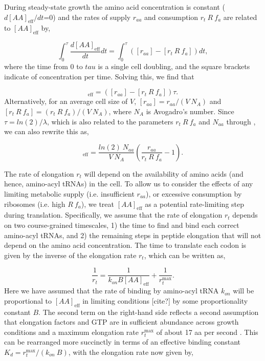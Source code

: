 During steady-state
growth the amino acid concentration is constant ($d[AA]_{\text{eff}}/dt$=0) and the rates of supply
$r_{aa}$ and consumption $r_t \ R \ f_a$ are related to $[AA]_{\text{eff}}$ by,

\begin{equation}
\int_{0}^{\tau} \frac{d[AA]_{\text{eff}}}{dt} dt =  \int_{0}^{\tau} ([r_{aa}] - [r_t \ R \ f_a]) dt,
\end{equation}
where the time from 0 to $tau$ is a single cell doubling, and the square brackets indicate of concentration per time. Solving this, we find that

\begin{equation}
[AA]_{\text{eff}} =  ([r_{aa}] - [r_t \ R \ f_a]) \tau.
\end{equation}
Alternatively, for an average cell size of $V$,  $[r_{aa}] = r_{aa}/(V \ N_A)$
and $[r_t \ R \ f_a] = (r_t \ R \ f_a)/(V \ N_A)$, where $N_A$ is Avogadro's
number. Since $\tau = ln(2)/\lambda$, which is also related to the parameters
$r_t \ R \ f_a$ and $N_{aa}$ through , we
can also rewrite this as,

\begin{equation}
[AA]_{\text{eff}} = \frac{ln(2) \ N_{aa}}{V \ N_A} \left(\frac{r_{aa}}{r_t \ R \ f_a} - 1 \right) .
\label{eq:aa_final}
\end{equation}

The rate of elongation $r_t$ will depend on the availability of amino acids (and
hence, amino-acyl tRNAs) in the cell. To allow us to consider the effects of any
limiting metabolic supply (i.e. insufficient $r_{aa}$), or excessive consumption
by ribosomes (i.e. high $R \ f_a$), we treat $[AA]_{\text{eff}}$ as a potential
rate-limiting step during translation. Specifically, we assume that the rate of
elongation $r_t$ depends on two course-grained timescales, 1) the time to find
and bind each correct amino-acyl tRNAs, and
2) the remaining steps in peptide elongation that will not depend on the amino
acid concentration. The time to translate each codon is given by the inverse of the elongation
rate $r_t$, which can be written as,

\begin{equation}
\frac{1}{r_t} = \frac{1}{k_{on} B [AA]_{\text{eff}}} + \frac{1}{r_{t}^{\text{max}}}.
\end{equation}
Here we have assumed that the rate of binding by amino-acyl tRNA $k_{on}$ will
be proportional to $[AA]_{\text{eff}}$ in limiting conditions [cite?] by some
proportionality constant $B$. The second term on the right-hand side reflects a second
assumption that elongation factors and GTP are in sufficient abundance across
growth conditions and a maximum elongation rate $r_{t}^{\text{max}}$
of about 17 aa per second \cite{dai2016}. This can be rearranged more succinctly in
terms of an effective binding constant $K_d = r_{t}^{\text{max}}/ (k_{on} \ B)$, with
the elongation rate now given by,


